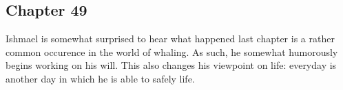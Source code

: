 \subsection{Chapter 49}

Ishmael is somewhat surprised to hear what happened last chapter is a rather
common occurence in the world of whaling. As such, he somewhat humorously
begins working on his will. This also changes his viewpoint on life: everyday
is another day in which he is able to safely life.
